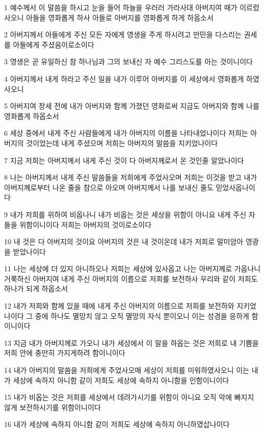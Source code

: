 \par 1 예수께서 이 말씀을 하시고 눈을 들어 하늘을 우러러 가라사대 아버지여 때가 이르렀사오니 아들을 영화롭게 하사 아들로 아버지를 영화롭게 하게 하옵소서
\par 2 아버지께서 아들에게 주신 모든 자에게 영생을 주게 하시려고 만민을 다스리는 권세를 아들에게 주셨음이로소이다
\par 3 영생은 곧 유일하신 참 하나님과 그의 보내신 자 예수 그리스도를 아는 것이니이다
\par 4 아버지께서 내게 하라고 주신 일을 내가 이루어 아버지를 이 세상에서 영화롭게 하였사오니
\par 5 아버지여 창세 전에 내가 아버지와 함께 가졌던 영화로써 지금도 아버지와 함께 나를 영화롭게 하옵소서
\par 6 세상 중에서 내게 주신 사람들에게 내가 아버지의 이름을 나타내었나이다 저희는 아버지의 것이었는데 내게 주셨으며 저희는 아버지의 말씀을 지키었나이다
\par 7 지금 저희는 아버지께서 내게 주신 것이 다 아버지께로서 온 것인줄 알았나이다
\par 8 나는 아버지께서 내게 주신 말씀들을 저희에게 주었사오며 저희는 이것을 받고 내가 아버지께로부터 나온 줄을 참으로 아오며 아버지께서 나를 보내신 줄도 믿었사옵나이다
\par 9 내가 저희를 위하여 비옵나니 내가 비옵는 것은 세상을 위함이 아니요 내게 주신 자들을 위함이니이다 저희는 아버지의 것이로소이다
\par 10 내 것은 다 아버지의 것이요 아버지의 것은 내 것이온데 내가 저희로 말미암아 영광을 받았나이다
\par 11 나는 세상에 더 있지 아니하오나 저희는 세상에 있사옵고 나는 아버지께로 가옵나니 거룩하신 아버지여 내게 주신 아버지의 이름으로 저희를 보전하사 우리와 같이 저희도 하나가 되게 하옵소서
\par 12 내가 저희와 함께 있을 때에 내게 주신 아버지의 이름으로 저희를 보전하와 지키었나이다 그 중에 하나도 멸망치 않고 오직 멸망의 자식 뿐이오니 이는 성경을 응하게 함이니이다
\par 13 지금 내가 아버지께로 가오니 내가 세상에서 이 말을 하옵는 것은 저희로 내 기쁨을 저희 안에 충만히 가지게하려 함이니이다
\par 14 내가 아버지의 말씀을 저희에게 주었사오매 세상이 저희를 미워하였사오니 이는 내가 세상에 속하지 아니함 같이 저희도 세상에 속하지 아니함을 인함이니이다
\par 15 내가 비옵는 것은 저희를 세상에서 데려가시기를 위함이 아니요 오직 악에 빠지지 않게 보전하시기를 위함이니이다
\par 16 내가 세상에 속하지 아니함 같이 저희도 세상에 속하지 아니하였삽나이다
